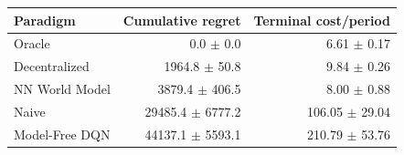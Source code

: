 \begin{tabular}{lrr}
\toprule
Paradigm & Cumulative regret & Terminal cost/period \\
\midrule
Oracle & 0.0 $\pm$ 0.0 & 6.61 $\pm$ 0.17 \\
Decentralized & 1964.8 $\pm$ 50.8 & 9.84 $\pm$ 0.26 \\
NN World Model & 3879.4 $\pm$ 406.5 & 8.00 $\pm$ 0.88 \\
Naive & 29485.4 $\pm$ 6777.2 & 106.05 $\pm$ 29.04 \\
Model-Free DQN & 44137.1 $\pm$ 5593.1 & 210.79 $\pm$ 53.76 \\
\bottomrule
\end{tabular}
